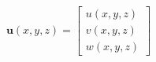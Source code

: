 \documentclass[preview]{standalone}
\begin{document}
\begin{align*}
\mathbf{u}(x,y,z) = \begin{bmatrix} u(x,y,z) \\ v(x,y,z) \\ w(x,y,z) \end{bmatrix}
\end{align*}
\end{document}
